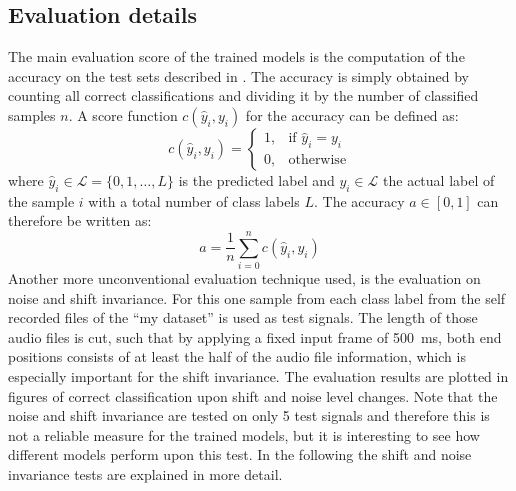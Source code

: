
\subsection{Evaluation details}\label{sec:exp_details_tb}
The main evaluation score of the trained models is the computation of the accuracy on the test sets described in .
The accuracy is simply obtained by counting all correct classifications and dividing it by the number of classified samples $n$.
A score function $c(\hat{y}_i, y_i)$ for the accuracy can be defined as:
\begin{equation}
  c(\hat{y}_i, y_i) = 
  \begin{cases}
    1, & \text{if } \hat{y}_i = y_i\\
    0, & \text{otherwise} 
  \end{cases}
\end{equation}
where $\hat{y}_i \in \mathcal{L} = \{0, 1, \dots, L\} $ is the predicted label and $y_i \in \mathcal{L}$ the actual label of the sample $i$ with a total number of class labels $L$.
The accuracy $a \in [0, 1]$ can therefore be written as:
\begin{equation}
  a = \frac{1}{n} \sum_{i=0}^n c(\hat{y}_i, y_i)
\end{equation}
Another more unconventional evaluation technique used, is the evaluation on noise and shift invariance.
For this one sample from each class label from the self recorded files of the \enquote{my dataset} is used as test signals.
The length of those audio files is cut, such that by applying a fixed input frame of \SI{500}{\milli\second}, both end positions consists of at least the half of the audio file information, which is especially important for the shift invariance.
The evaluation results are plotted in figures of correct classification upon shift and noise level changes.
Note that the noise and shift invariance are tested on only 5 test signals and therefore this is not a reliable measure for the trained models, but it is interesting to see how different models perform upon this test.
In the following the shift and noise invariance tests are explained in more detail.



